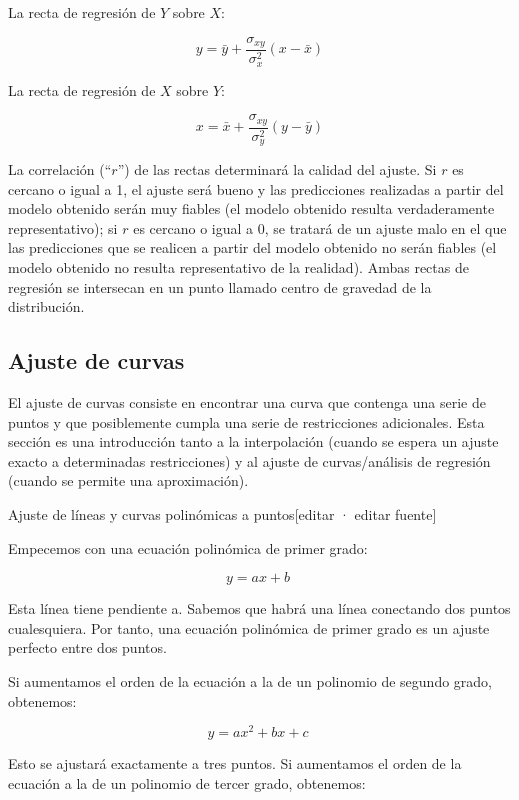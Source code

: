 \documentclass{article}
\begin{document}
La recta de regresión de $Y$ sobre $X$:

\begin{equation}
y = \bar{y} + \frac{\sigma_{xy}}{\sigma_{x}^2}(x - \bar{x})
\end{equation}

La recta de regresión de $X$ sobre $Y$:

\begin{equation}
x = \bar{x} + \frac{\sigma_{xy}}{\sigma_{y}^2}(y - \bar{y})
\end{equation}

La correlación (``$r$'') de las rectas determinará la calidad del
ajuste. Si $r$ es cercano o igual a 1, el ajuste será bueno y las
predicciones realizadas a partir del modelo obtenido serán muy fiables
(el modelo obtenido resulta verdaderamente representativo); si $r$ es
cercano o igual a 0, se tratará de un ajuste malo en el que las
predicciones que se realicen a partir del modelo obtenido no serán
fiables (el modelo obtenido no resulta representativo de la realidad).
Ambas rectas de regresión se intersecan en un punto llamado centro de
gravedad de la distribución.


    \subsection{Ajuste de curvas}


    El ajuste de curvas consiste en encontrar una curva que contenga una
serie de puntos y que posiblemente cumpla una serie de restricciones
adicionales. Esta sección es una introducción tanto a la interpolación
(cuando se espera un ajuste exacto a determinadas restricciones) y al
ajuste de curvas/análisis de regresión (cuando se permite una
aproximación).

    Ajuste de líneas y curvas polinómicas a puntos{[}editar · editar
fuente{]}

Empecemos con una ecuación polinómica de primer grado:

\[
y = ax + b\;
\]

Esta línea tiene pendiente a. Sabemos que habrá una línea conectando dos
puntos cualesquiera. Por tanto, una ecuación polinómica de primer grado
es un ajuste perfecto entre dos puntos.

Si aumentamos el orden de la ecuación a la de un polinomio de segundo
grado, obtenemos:

\[
y = ax^2 + bx + c\;
\]

Esto se ajustará exactamente a tres puntos. Si aumentamos el orden de la
ecuación a la de un polinomio de tercer grado, obtenemos:
\end{document}
